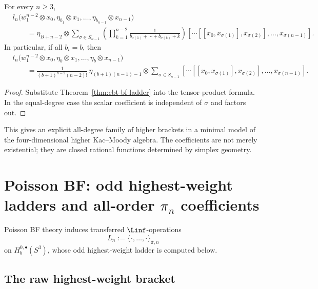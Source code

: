 \begin{theorem}
\label{thm:cbt-km-ladder}
\ClaimStatusProvedHere
For every $n\ge3$,
\[
\begin{aligned}
&l_n\bigl(w_1^{n-2}\otimes x_0,\eta_{b_1}\otimes x_1,\dots,\eta_{b_{n-1}}\otimes x_{n-1}\bigr)\\
&\qquad=
\eta_{B+n-2}\otimes
\sum_{\sigma\in S_{n-1}}
\left(\prod_{k=1}^{n-2}\frac{1}{b_{\sigma(1)}+\cdots+b_{\sigma(k)}+k}\right)
[\cdots[[x_0,x_{\sigma(1)}],x_{\sigma(2)}],\dots,x_{\sigma(n-1)}].
\end{aligned}
\]
In particular, if all $b_i=b$, then
\[
\begin{aligned}
&l_n\bigl(w_1^{n-2}\otimes x_0,\eta_b\otimes x_1,\dots,\eta_b\otimes x_{n-1}\bigr)\\
&\qquad=
\frac{1}{(b+1)^{n-2}(n-2)!}\,
\eta_{(b+1)(n-1)-1}\otimes
\sum_{\sigma\in S_{n-1}}
[\cdots[[x_0,x_{\sigma(1)}],x_{\sigma(2)}],\dots,x_{\sigma(n-1)}].
\end{aligned}
\]
\end{theorem}

\begin{proof}
Substitute Theorem~\ref{thm:cbt-bf-ladder} into the tensor-product formula. In the equal-degree case the scalar coefficient is independent of $\sigma$ and factors out.
\end{proof}

\begin{remark}
\label{rem:cbt-km-remark}
This gives an explicit all-degree family of higher brackets in a minimal model of the four-dimensional higher Kac--Moody algebra. The coefficients are not merely existential; they are closed rational functions determined by simplex geometry.
\end{remark}

\section{Poisson BF: odd highest-weight ladders and all-order $\pi_n$ coefficients}
\label{sec:cbt-poisson-bf}

Poisson BF theory induces transferred $\Linf$-operations
\[
L_n:=\{\cdot,\dots,\cdot\}_{\bar\pi,n}
\]
on $H_b^{0,\bullet}(S^3)$, whose odd highest-weight ladder is computed below.

\subsection{The raw highest-weight bracket}
\label{sec:cbt-raw-hw-bracket}

